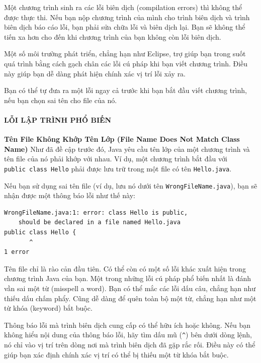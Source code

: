 Một chương trình sinh ra các lỗi biên dịch (compilation errors) thì
không thể được thực thi. Nếu bạn nộp chương trình của mình cho trình
biên dịch và trình biên dịch báo cáo lỗi, bạn phải sửa chữa lỗi và biên
dịch lại. Bạn sẽ không thể tiến xa hơn cho đến khi chương trình của bạn
không còn lỗi biên dịch.

Một số môi trường phát triển, chẳng hạn như Eclipse, trợ giúp bạn trong
suốt quá trình bằng cách gạch chân các lỗi cú pháp khi bạn viết chương
trình. Điều này giúp bạn dễ dàng phát hiện chính xác vị trí lỗi xảy ra.

Bạn có thể tự đưa ra một lỗi ngay cả trước khi bạn bắt đầu viết chương
trình, nếu bạn chọn sai tên cho file của nó.

\paragraph{LỖI LẬP TRÌNH PHỔ
BIẾN}\label{lux1ed7i-lux1eadp-truxecnh-phux1ed5-biux1ebfn}

\textbf{Tên File Không Khớp Tên Lớp (File Name Does Not Match Class
Name)} Như đã đề cập trước đó, Java yêu cầu tên lớp của một chương trình
và tên file của nó phải khớp với nhau. Ví dụ, một chương trình bắt đầu
với \texttt{public\ class\ Hello} phải được lưu trữ trong một file có
tên \texttt{Hello.java}.

Nếu bạn sử dụng sai tên file (ví dụ, lưu nó dưới tên
\texttt{WrongFileName.java}), bạn sẽ nhận được một thông báo lỗi như thế
này:

\begin{verbatim}
WrongFileName.java:1: error: class Hello is public,
    should be declared in a file named Hello.java
public class Hello {
       ^
1 error
\end{verbatim}

Tên file chỉ là rào cản đầu tiên. Có thể còn có một số lỗi khác xuất
hiện trong chương trình Java của bạn. Một trong những lỗi cú pháp phổ
biến nhất là đánh vần sai một từ (misspell a word). Bạn có thể mắc các
lỗi dấu câu, chẳng hạn như thiếu dấu chấm phẩy. Cũng dễ dàng để quên
toàn bộ một từ, chẳng hạn như một từ khóa (keyword) bắt buộc.

Thông báo lỗi mà trình biên dịch cung cấp có thể hữu ích hoặc không. Nếu
bạn không hiểu nội dung của thông báo lỗi, hãy tìm dấu mũ
(\texttt{\^{}}) bên dưới dòng lệnh, nó chỉ vào vị trí trên dòng nơi mà
trình biên dịch đã gặp rắc rối. Điều này có thể giúp bạn xác định chính
xác vị trí có thể bị thiếu một từ khóa bắt buộc.


